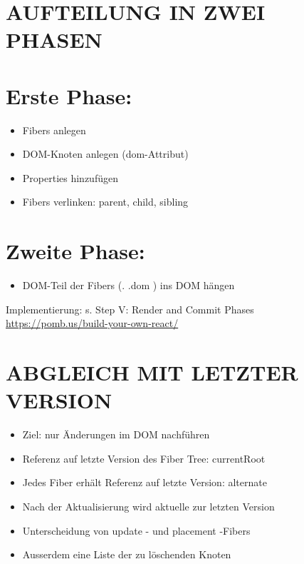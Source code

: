 \section*{AUFTEILUNG IN ZWEI PHASEN}
\section*{Erste Phase:}
\begin{itemize}
  \item Fibers anlegen
  \item DOM-Knoten anlegen (dom-Attribut)
  \item Properties hinzufügen
  \item Fibers verlinken: parent, child, sibling
\end{itemize}

\section*{Zweite Phase:}
\begin{itemize}
  \item DOM-Teil der Fibers (. .dom ) ins DOM hängen
\end{itemize}

Implementierung: s. Step V: Render and Commit Phases\\
\href{https://pomb.us/build-your-own-react/}{https://pomb.us/build-your-own-react/}

\section*{ABGLEICH MIT LETZTER VERSION}
\begin{itemize}
  \item Ziel: nur Änderungen im DOM nachführen
  \item Referenz auf letzte Version des Fiber Tree: currentRoot
  \item Jedes Fiber erhält Referenz auf letzte Version: alternate
  \item Nach der Aktualisierung wird aktuelle zur letzten Version
  \item Unterscheidung von update - und placement -Fibers
  \item Ausserdem eine Liste der zu löschenden Knoten
\end{itemize}